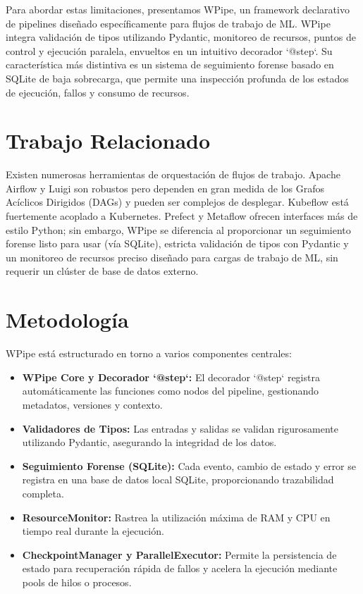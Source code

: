 \documentclass[conference]{IEEEtran}
\begin{document}
Para abordar estas limitaciones, presentamos WPipe, un framework declarativo de pipelines diseñado específicamente para flujos de trabajo de ML. WPipe integra validación de tipos utilizando Pydantic, monitoreo de recursos, puntos de control y ejecución paralela, envueltos en un intuitivo decorador `@step`. Su característica más distintiva es un sistema de seguimiento forense basado en SQLite de baja sobrecarga, que permite una inspección profunda de los estados de ejecución, fallos y consumo de recursos.

\section{Trabajo Relacionado}
Existen numerosas herramientas de orquestación de flujos de trabajo. Apache Airflow \cite{airflow} y Luigi \cite{luigi} son robustos pero dependen en gran medida de los Grafos Acíclicos Dirigidos (DAGs) y pueden ser complejos de desplegar. Kubeflow \cite{kubeflow} está fuertemente acoplado a Kubernetes. Prefect \cite{prefect} y Metaflow \cite{metaflow} ofrecen interfaces más de estilo Python; sin embargo, WPipe se diferencia al proporcionar un seguimiento forense listo para usar (vía SQLite), estricta validación de tipos con Pydantic y un monitoreo de recursos preciso diseñado para cargas de trabajo de ML, sin requerir un clúster de base de datos externo.

\section{Metodología}
WPipe está estructurado en torno a varios componentes centrales:
\begin{itemize}
    \item \textbf{WPipe Core y Decorador `@step`:} El decorador `@step` registra automáticamente las funciones como nodos del pipeline, gestionando metadatos, versiones y contexto.
    \item \textbf{Validadores de Tipos:} Las entradas y salidas se validan rigurosamente utilizando Pydantic, asegurando la integridad de los datos.
    \item \textbf{Seguimiento Forense (SQLite):} Cada evento, cambio de estado y error se registra en una base de datos local SQLite, proporcionando trazabilidad completa.
    \item \textbf{ResourceMonitor:} Rastrea la utilización máxima de RAM y CPU en tiempo real durante la ejecución.
    \item \textbf{CheckpointManager y ParallelExecutor:} Permite la persistencia de estado para recuperación rápida de fallos y acelera la ejecución mediante pools de hilos o procesos.
\end{itemize}
\end{document}
